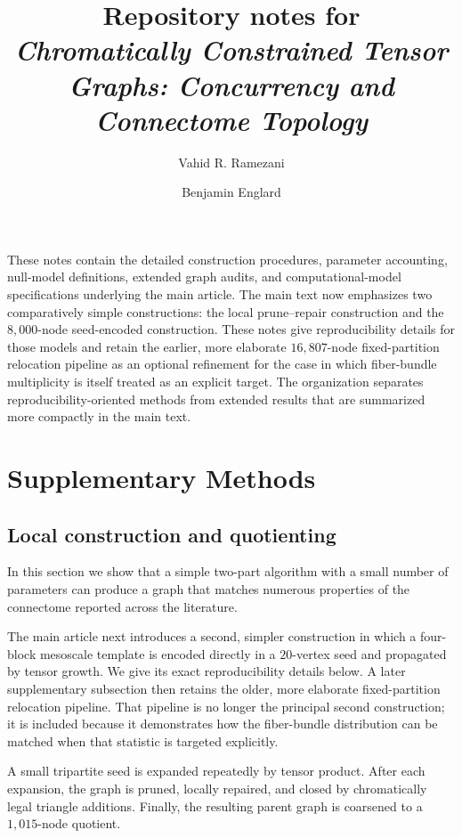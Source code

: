 \documentclass[12pt]{article}
\title{Repository notes for\\
\emph{Chromatically Constrained Tensor Graphs: Concurrency and Connectome Topology}}
\author{Vahid R. Ramezani \and Benjamin Englard}
\date{}
\begin{document}
\sloppy
\maketitle

\noindent
These notes contain the detailed construction procedures,
parameter accounting, null-model definitions, extended graph audits, and
computational-model specifications underlying the main article. The main text
now emphasizes two comparatively simple constructions: the local
prune--repair construction and the $8{,}000$-node seed-encoded construction.
These notes give reproducibility details for those models and
retain the earlier, more elaborate $16{,}807$-node fixed-partition relocation
pipeline as an optional refinement for the case in which fiber-bundle
multiplicity is itself treated as an explicit target. The organization
separates reproducibility-oriented methods from extended results that are
summarized more compactly in the main text.

\section{Supplementary Methods}
\label{supp:methods}

\subsection{Local construction and quotienting}

In this section we show that a simple two-part algorithm with a small number
of parameters can produce a graph that matches numerous properties of the
connectome reported across the literature.

The main article next introduces a second, simpler construction in which a
four-block mesoscale template is encoded directly in a $20$-vertex seed and
propagated by tensor growth. We give its exact reproducibility details below.
A later supplementary subsection then retains the older, more elaborate
fixed-partition relocation pipeline. That pipeline is no longer the principal
second construction; it is included because it demonstrates how the
fiber-bundle distribution can be matched when that statistic is targeted
explicitly.

A small tripartite seed is expanded repeatedly by tensor product.  After
each expansion, the graph is pruned, locally repaired, and closed by
chromatically legal triangle additions.  Finally, the resulting parent graph
is coarsened to a \(1{,}015\)-node quotient.
\end{document}
